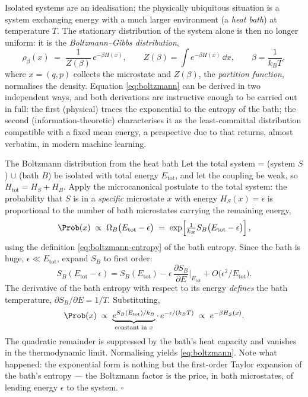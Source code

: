 Isolated systems are an idealisation; the physically ubiquitous situation is
a system exchanging energy with a much larger environment (a \emph{heat
bath}) at temperature $T$. The stationary distribution of the system alone is
then no longer uniform: it is the \emph{Boltzmann--Gibbs distribution},
\begin{equation}
  \boxed{\;
  \rho_\beta(x) \;=\; \frac{1}{Z(\beta)}\, e^{-\beta H(x)},
  \qquad
  Z(\beta) = \int e^{-\beta H(x)}\,\dd x,
  \qquad
  \beta = \frac{1}{k_B T},
  \;}
  \label{eq:boltzmann}
\end{equation}
where $x = (q,p)$ collects the microstate and $Z(\beta)$, the
\emph{partition function}, normalises the density. Equation
\eqref{eq:boltzmann} can be derived in two independent ways, and both
derivations are instructive enough to be carried out in full: the first
(physical) traces the exponential to the entropy of the bath; the second
(information-theoretic) characterises it as the least-committal distribution
compatible with a fixed mean energy, a perspective due to
\citet{jaynes1957information} that returns, almost verbatim, in modern
machine learning.

\begin{toolbox}{The Boltzmann distribution from the heat bath}
Let the total system = (system $S$) $\cup$ (bath $B$) be isolated with total
energy $E_{\mathrm{tot}}$, and let the coupling be weak, so
$H_{\mathrm{tot}} = H_S + H_B$. Apply the microcanonical postulate to the
total system: the probability that $S$ is in a \emph{specific} microstate
$x$ with energy $H_S(x) = \epsilon$ is proportional to the number of bath
microstates carrying the remaining energy,
\begin{equation*}
  \Prob(x) \;\propto\; \Omega_B\big(E_{\mathrm{tot}} - \epsilon\big)
  \;=\; \exp\!\left[ \tfrac{1}{k_B} S_B\big(E_{\mathrm{tot}} - \epsilon\big) \right],
\end{equation*}
using the definition \eqref{eq:boltzmann-entropy} of the bath entropy. Since
the bath is huge, $\epsilon \ll E_{\mathrm{tot}}$, expand $S_B$ to first
order:
\begin{equation*}
  S_B(E_{\mathrm{tot}} - \epsilon)
  = S_B(E_{\mathrm{tot}})
  - \epsilon \,\frac{\partial S_B}{\partial E}\Big|_{E_{\mathrm{tot}}}
  + O\!\big(\epsilon^2 / E_{\mathrm{tot}}\big).
\end{equation*}
The derivative of the bath entropy with respect to its energy \emph{defines}
the bath temperature, $\partial S_B / \partial E = 1/T$. Substituting,
\begin{equation*}
  \Prob(x) \;\propto\;
  \underbrace{e^{S_B(E_{\mathrm{tot}})/k_B}}_{\text{constant in } x}
  \cdot\, e^{-\epsilon/(k_B T)}
  \;\propto\; e^{-\beta H_S(x)} .
\end{equation*}
The quadratic remainder is suppressed by the bath's heat capacity and
vanishes in the thermodynamic limit. Normalising yields
\eqref{eq:boltzmann}. Note what happened: the exponential form is nothing but
the first-order Taylor expansion of the bath's entropy --- the Boltzmann
factor is the price, in bath microstates, of lending energy $\epsilon$ to the
system. \hfill$\square$
\end{toolbox}

